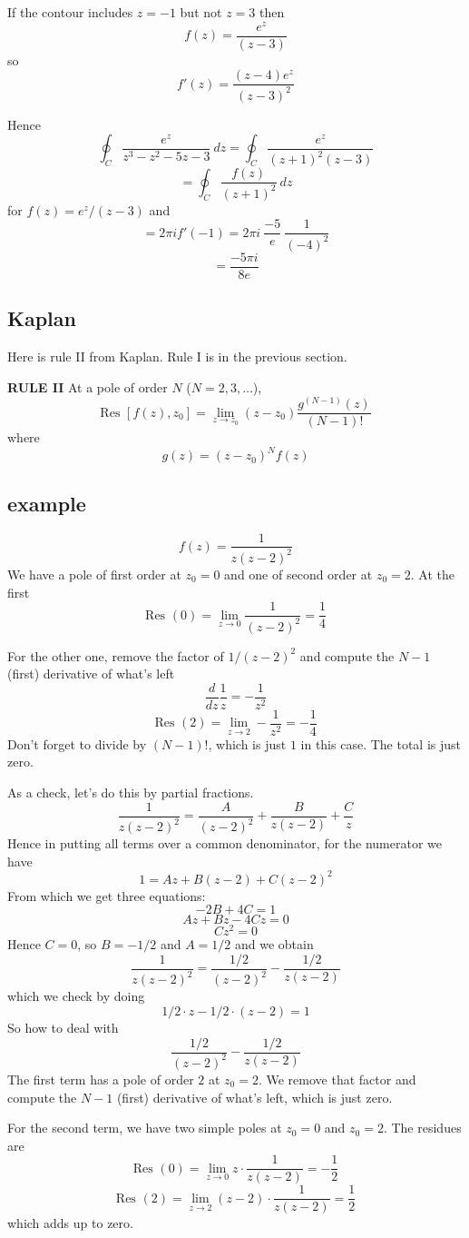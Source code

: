 \documentclass[11pt, oneside]{article}
\begin{document}
If the contour includes $z = -1$ but not $z = 3$ then
\[ f(z) = \frac{e^z}{(z-3)} \]
so
\[ f'(z) = \frac{(z-4)e^z}{(z-3)^2} \]

Hence
\[ \oint_C \frac{e^z}{z^3 - z^2 - 5z - 3} \ dz = \oint_C \frac{e^z}{(z+1)^2 (z-3)} \]
\[ = \oint_C \frac{f(z)}{(z+1)^2} \ dz \]
for $f(z) = e^z/(z-3) $ and
\[ = 2 \pi i f'(-1) = 2 \pi i \ \frac{-5}{e} \ \frac{1}{(-4)^2} \]
\[ = \frac{-5 \pi i}{8 e}  \]

\subsection*{Kaplan}
Here is rule II from Kaplan.  Rule I is in the previous section.

\textbf{RULE II}  At a pole of order $N$ ($N = 2, 3, \dots$),
\[ \text{Res } [f(z),z_0] = \lim_{z \rightarrow z_0} (z-z_0) \frac{g^{(N-1)}(z)}{(N-1)!} \]
where 
\[ g(z) = (z-z_0)^N f(z) \]

\subsection*{example}
\[ f(z) = \frac{1}{z(z-2)^2} \]
We have a pole of first order at $z_0=0$ and one of second order at $z_0=2$.  At the first
\[ \text{Res }(0) = \lim_{z \rightarrow 0} \frac{1}{(z-2)^2} = \frac{1}{4} \]

For the other one, remove the factor of $1/(z-2)^2$ and compute the $N-1$ (first) derivative of what's left
\[ \frac{d}{dz} \frac{1}{z} =  - \frac{1}{z^2} \]
\[ \text{Res } (2) = \lim_{z \rightarrow 2} -\frac{1}{z^2} = -\frac{1}{4} \]
Don't forget to divide by $(N-1)!$, which is just $1$ in this case.  The total is just zero.

As a check, let's do this by partial fractions.
\[ \frac{1}{z(z-2)^2} = \frac{A}{(z-2)^2} +  \frac{B}{z(z-2)} +  \frac{C}{z}  \]
Hence in putting all terms over a common denominator, for the numerator we have
\[ 1 = Az + B(z-2) + C(z-2)^2 \]
From which we get three equations:
\[ -2B + 4C = 1 \]
\[ Az + Bz - 4Cz = 0 \]
\[ Cz^2 = 0 \]
Hence $C = 0$, so $B = -1/2$ and $A = 1/2$ and we obtain
\[ \frac{1}{z(z-2)^2} = \frac{1/2}{(z-2)^2} - \frac{1/2}{z(z-2)} \]
which we check by doing
\[ 1/2 \cdot z - 1/2 \cdot (z-2) = 1 \]
So how to deal with 
\[ \frac{1/2}{(z-2)^2} - \frac{1/2}{z(z-2)} \]
The first term has a pole of order $2$ at $z_0 = 2$.  We remove that factor and compute the $N-1$ (first) derivative of what's left, which is just zero.  

For the second term, we have two simple poles at $z_0=0$ and $z_0=2$.  The residues are
\[ \text{Res } (0) = \lim_{z \rightarrow 0} z \cdot \frac{1}{z(z-2)} = - \frac{1}{2} \]
\[ \text{Res } (2) = \lim_{z \rightarrow 2} (z-2) \cdot \frac{1}{z(z-2)} = \frac{1}{2} \]
which adds up to zero.
\end{document}
